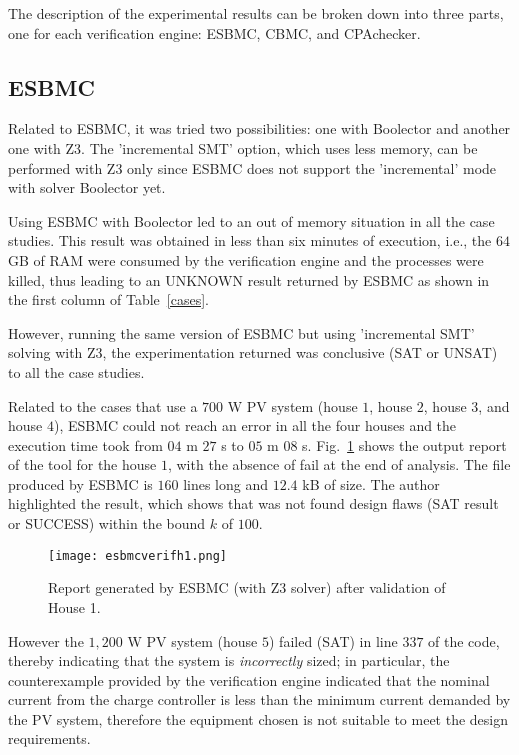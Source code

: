 The description of the experimental results can be broken down into three parts, one for each verification engine: ESBMC, CBMC, and CPAchecker. 

\subsection{ESBMC}

Related to ESBMC, it was tried two possibilities: one with Boolector and another one with Z3. The 'incremental SMT' option, which uses less memory, can be performed with Z3 only since ESBMC does not support the 'incremental' mode with solver Boolector yet. 

Using ESBMC with Boolector led to an out of memory situation in all the case studies. This result was obtained in less than six minutes of execution, i.e., the $64$ GB of RAM were consumed by the verification engine and the processes were killed, thus leading to an UNKNOWN result returned by ESBMC as shown in the first column of Table~\ref{cases}. 

However, running the same version of ESBMC but using 'incremental SMT' solving with Z3, the experimentation returned was conclusive (SAT or UNSAT) to all the case studies. 

Related to the cases that use a $700$ W PV system (house $1$, house $2$, house $3$, and house $4$), ESBMC could not reach an error in all the four houses and the execution time took from $04$ m $27$ s to $05$ m $08$ s. Fig.~\ref{fig:esbmcverifhouse1} shows the output report of the tool for the house $1$, with the absence of fail at the end of analysis. The file produced by ESBMC is $160$ lines long and $12.4$ kB of size. The author highlighted the result, which shows that was not found design flaws (SAT result or SUCCESS) within the bound $k$ of $100$.

\begin{figure}[h]
\texttt{[image: esbmcverifh1.png]}
\centering
\caption{Report generated by ESBMC (with Z3 solver) after validation of House 1.}
\label{fig:esbmcverifhouse1}
\end{figure}

However the $1,200$ W PV system (house $5$) failed (SAT) in line $337$ of the code, thereby indicating that the system is \textit{incorrectly} sized; in particular, the counterexample provided by the verification engine indicated that the nominal current from the charge controller is less than the minimum current demanded by the PV system, therefore the equipment chosen is not suitable to meet the design requirements.

